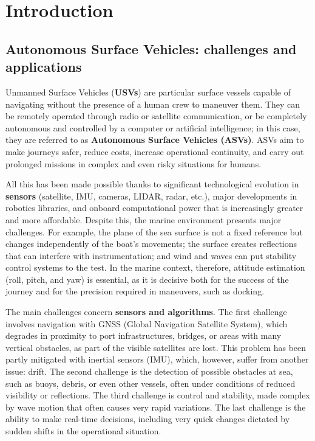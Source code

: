 \chapter{Introduction}
\thispagestyle{empty}
\section{Autonomous Surface Vehicles: challenges and applications}
Unmanned Surface Vehicles (\textbf{USVs}) are particular surface vessels capable of navigating without the presence of a human crew to maneuver them. They can be remotely operated through radio or satellite communication, or be completely autonomous and controlled by a computer or artificial intelligence; in this case, they are referred to as \textbf{Autonomous Surface Vehicles (ASVs)}. ASVs aim to make journeys safer, reduce costs, increase operational continuity, and carry out prolonged missions in complex and even risky situations for humans.

All this has been made possible thanks to significant technological evolution in \textbf{sensors} (satellite, IMU, cameras, LIDAR, radar, etc.), major developments in robotics libraries, and onboard computational power that is increasingly greater and more affordable. Despite this, the marine environment presents major challenges. For example, the plane of the sea surface is not a fixed reference but changes independently of the boat’s movements; the surface creates reflections that can interfere with instrumentation; and wind and waves can put stability control systems to the test. In the marine context, therefore, attitude estimation (roll, pitch, and yaw) is essential, as it is decisive both for the success of the journey and for the precision required in maneuvers, such as docking.

The main challenges concern \textbf{sensors and algorithms}. The first challenge involves navigation with GNSS (Global Navigation Satellite System), which degrades in proximity to port infrastructures, bridges, or areas with many vertical obstacles, as part of the visible satellites are lost. This problem has been partly mitigated with inertial sensors (IMU), which, however, suffer from another issue: drift. The second challenge is the detection of possible obstacles at sea, such as buoys, debris, or even other vessels, often under conditions of reduced visibility or reflections. The third challenge is control and stability, made complex by wave motion that often causes very rapid variations. The last challenge is the ability to make real-time decisions, including very quick changes dictated by sudden shifts in the operational situation.

